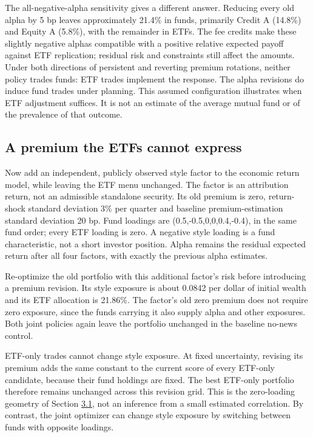 \documentclass[11pt]{article}
\begin{document}
The all-negative-alpha sensitivity gives a different answer. Reducing every old alpha by 5 bp leaves approximately 21.4\% in funds, primarily Credit A (14.8\%) and Equity A (5.8\%), with the remainder in ETFs. The fee credits make these slightly negative alphas compatible with a positive relative expected payoff against ETF replication; residual risk and constraints still affect the amounts. Under both directions of persistent and reverting premium rotations, neither policy trades funds: ETF trades implement the response. The alpha revisions do induce fund trades under planning. This assumed configuration illustrates when ETF adjustment suffices. It is not an estimate of the average mutual fund or of the prevalence of that outcome.

\subsection{A premium the ETFs cannot express}\label{sec:6.3}

Now add an independent, publicly observed style factor to the economic return model, while leaving the ETF menu unchanged. The factor is an attribution return, not an admissible standalone security. Its old premium is zero, return-shock standard deviation 3\% per quarter and baseline premium-estimation standard deviation 20 bp. Fund loadings are (0.5,-0.5,0,0,0.4,-0.4), in the same fund order; every ETF loading is zero. A negative style loading is a fund characteristic, not a short investor position. Alpha remains the residual expected return after all four factors, with exactly the previous alpha estimates.

Re-optimize the old portfolio with this additional factor's risk before introducing a premium revision. Its style exposure is about 0.0842 per dollar of initial wealth and its ETF allocation is 21.86\%. The factor's old zero premium does not require zero exposure, since the funds carrying it also supply alpha and other exposures. Both joint policies again leave the portfolio unchanged in the baseline no-news control.

ETF-only trades cannot change style exposure. At fixed uncertainty, revising its premium adds the same constant to the current score of every ETF-only candidate, because their fund holdings are fixed. The best ETF-only portfolio therefore remains unchanged across this revision grid. This is the zero-loading geometry of Section \hyperref[sec:3.1]{3.1}, not an inference from a small estimated correlation. By contrast, the joint optimizer can change style exposure by switching between funds with opposite loadings.
\end{document}
